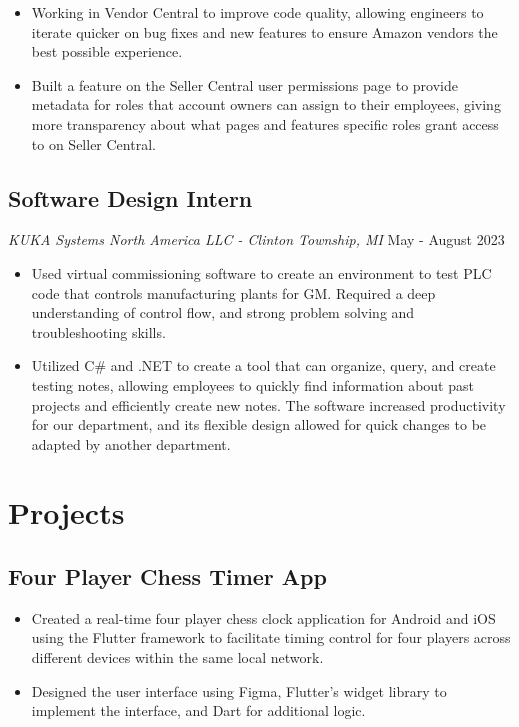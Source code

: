 \documentclass{article}
\newcommand{\resumesection}[1]{
	\section*{\Large\textbf{#1}}
	\hrulefill
	\vspace{1ex}
}
\begin{document}
\begin{itemize}
	\item Working in Vendor Central to improve code quality, allowing engineers to iterate quicker on bug fixes and new features to ensure Amazon vendors the best possible experience.
	\item Built a feature on the Seller Central user permissions page to provide metadata for roles that account owners can assign to their employees, giving more transparency about what pages and features specific roles grant access to on Seller Central. 
		
\end{itemize}

\subsection*{Software Design Intern} 

\textit{KUKA Systems North America LLC - Clinton Township, MI} \hfill {May - August 2023}

\begin{itemize}
	\item Used virtual commissioning software to create an environment to test PLC code that controls manufacturing plants for GM. Required a deep understanding of control flow, and strong problem solving and troubleshooting skills.
	\item Utilized C\# and .NET to create a tool that can organize, query, and create testing notes, allowing employees to quickly find information about past projects and efficiently create new notes. The software increased productivity for our department, and its flexible design allowed for quick changes to be adapted by another department.
\end{itemize}


\resumesection{Projects}

\subsection*{Four Player Chess Timer App}

\begin{itemize}
	\item Created a real-time four player chess clock application for Android and iOS using the Flutter framework to facilitate timing control for four players across different devices within the same local network. 
	\item Designed the user interface using Figma, \hspace{49152sp}Flutter's widget library to implement the interface, and Dart for additional logic.
\end{itemize}
\end{document}
